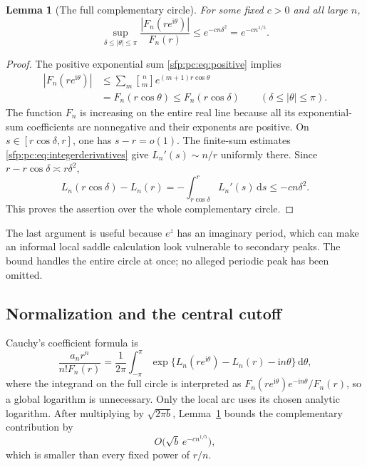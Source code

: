 \documentclass[11pt,letterpaper]{article}
\numberwithin{equation}{section}
\newtheorem{lemma}[theorem]{Lemma}
\theoremstyle{definition}\newtheorem{definition}[theorem]{Definition}
\theoremstyle{remark}\newtheorem{remark}[theorem]{Remark}
\newcommand{\sone}[2]{\genfrac{[}{]}{0pt}{}{#1}{#2}}
\newcommand{\dd}{\,\mathrm d}
\newcommand{\ii}{\mathrm i}
\begin{document}
\begin{lemma}[The full complementary circle]\label{sfp:pc:lem:minor}
For some fixed $c>0$ and all large $n$,
\begin{equation}\label{sfp:pc:eq:minor}
 \sup_{\delta\leq|\theta|\leq\pi}
 \frac{|F_n(re^{\ii\theta})|}{F_n(r)}
       \leq e^{-cn\delta^2}=e^{-cn^{1/5}}.
\end{equation}
\end{lemma}
\begin{proof}
The positive exponential sum \eqref{sfp:pc:eq:positive} implies
\begin{align*}
 |F_n(re^{\ii\theta})|
 &\leq\sum_m\sone nm e^{(m+1)r\cos\theta}\\
 &=F_n(r\cos\theta)\leq F_n(r\cos\delta)
       \qquad(\delta\leq|\theta|\leq\pi).
\end{align*}
The function $F_n$ is increasing on the entire real line because
all its exponential-sum coefficients are nonnegative and their
exponents are positive. On $s\in[r\cos\delta,r]$, one has
$s-r=o(1)$. The finite-sum estimates
\eqref{sfp:pc:eq:integerderivatives} give $L_n'(s)\sim n/r$ uniformly
there. Since $r-r\cos\delta\asymp r\delta^2$,
\[
 L_n(r\cos\delta)-L_n(r)
       =-\int_{r\cos\delta}^r L_n'(s)\dd s
       \leq-cn\delta^2.
\]
This proves the assertion over the whole complementary circle.
\end{proof}

The last argument is useful because $e^z$ has an imaginary period,
which can make an informal local saddle calculation look vulnerable
to secondary peaks. The bound handles the entire circle at once;
no alleged periodic peak has been omitted.

\subsection{Normalization and the central cutoff}

Cauchy's coefficient formula is
\begin{equation}\label{sfp:pc:eq:cauchy}
 \frac{a_nr^n}{n!F_n(r)}
 =\frac1{2\pi}\int_{-\pi}^{\pi}
      \exp\{L_n(re^{\ii\theta})-L_n(r)-\ii n\theta\}\dd\theta,
\end{equation}
where the integrand on the full circle is interpreted as
$F_n(re^{\ii\theta})e^{-\ii n\theta}/F_n(r)$, so a global
logarithm is unnecessary. Only the local arc uses its chosen
analytic logarithm. After multiplying by $\sqrt{2\pi b}$,
Lemma~\ref{sfp:pc:lem:minor} bounds the complementary contribution by
\[
 O\bigl(\sqrt b\,e^{-cn^{1/5}}\bigr),
\]
which is smaller than every fixed power of $r/n$.
\end{document}
